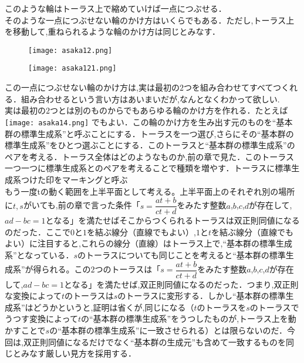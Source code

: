 このような輪はトーラス上で縮めていけば一点につぶせる．\\
そのような一点につぶせない輪のかけ方はいくらでもある．ただし,トーラス上を移動して,重ねられるような輪のかけ方は同じとみなす．\\
\begin{figure}[h]
\begin{minipage}{0.5\hsize}
\texttt{[image: asaka12.png]}\\
\end{minipage}
\begin{minipage}{0.5\hsize}
\texttt{[image: asaka121.png]}\\
\end{minipage}
\end{figure}
この一点につぶせない輪のかけ方は,実は最初の$2$つを組み合わせてすべてつくれる．組み合わせるという言い方はあいまいだが,なんとなくわかって欲しい.\\
実は最初の$2$つとは別のものからでもあらゆる輪のかけ方を作れる．たとえば\\
\texttt{[image: asaka14.png]}
でもよい．この輪のかけ方を生み出す元のものを``基本群の標準生成系''と呼ぶことにする．トーラスを一つ選び,さらにその``基本群の標準生成系''をひとつ選ぶことにする．このトーラスと``基本群の標準生成系''のペアを考える．トーラス全体はどのようなものか,前の章で見た．このトーラス一つ一つに標準生成系とのペアを考えることで種類を増やす．トーラスに標準生成系つけた印をマーキングと呼ぶ\\
もう一度tの動く範囲を上半平面として考える。上半平面上のそれぞれ別の場所に$t,s$がいても,前の章で言った条件「$s=\dfrac {at+b} {ct+d}$をみたす整数$a$,$b$,$c$,$d$が存在して,$ad-bc=1$となる」を満たせばそこからつくられるトーラスは双正則同値になるのだった．ここで$0$と$1$を結ぶ線分（直線でもよい）,$1$と$t$を結ぶ線分（直線でもよい）に注目すると,これらの線分（直線）はトーラス上で,``基本群の標準生成系''となっている．$s$のトーラスについても同じことを考えると``基本群の標準生成系''が得られる。この$2$つのトーラスは「$s=\dfrac {at+b} {ct+d}$をみたす整数$a$,$b$,$c$,$d$が存在して,$ad-bc=1$となる」を満たせば,双正則同値になるのだった．つまり,双正則な変換によって$t$のトーラスは$s$のトーラスに変形する．しかし``基本群の標準生成系''はどうかというと,証明は省くが,同じになる（$t$のトーラスを$s$のトーラスでうつす変換によって$t$の``基本群の標準生成系''をうつしたものが,トーラス上を動かすことで$s$の``基本群の標準生成系''に一致させられる）とは限らないのだ．今回は,双正則同値になるだけでなく``基本群の生成元''も含めて一致するものを同じとみなす厳しい見方を採用する．\\
